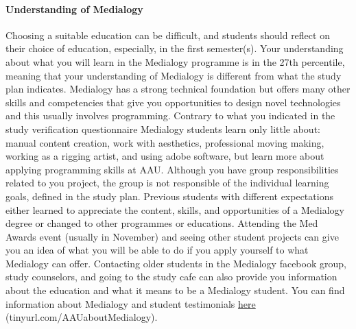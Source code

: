 \documentclass[]{article}
\let\oldparagraph\paragraph
\renewcommand{\paragraph}[1]{\oldparagraph{#1}\mbox{}}
\begin{document}
\paragraph{Understanding of Medialogy}\label{understanding-of-medialogy}

Choosing a suitable education can be difficult, and students should
reflect on their choice of education, especially, in the first
semester(s). Your understanding about what you will learn in the
Medialogy programme is in the 27th percentile, meaning that your
understanding of Medialogy is different from what the study plan
indicates. Medialogy has a strong technical foundation but offers many
other skills and competencies that give you opportunities to design
novel technologies and this usually involves programming. Contrary to
what you indicated in the study verification questionnaire Medialogy
students learn only little about: manual content creation, work with
aesthetics, professional moving making, working as a rigging artist, and
using adobe software, but learn more about applying programming skills
at AAU. Although you have group responsibilities related to you project,
the group is not responsible of the individual learning goals, defined
in the study plan. Previous students with different expectations either
learned to appreciate the content, skills, and opportunities of a
Medialogy degree or changed to other programmes or educations. Attending
the Med Awards event (usually in November) and seeing other student
projects can give you an idea of what you will be able to do if you
apply yourself to what Medialogy can offer. Contacting older students in
the Medialogy facebook group, study counselors, and going to the study
cafe can also provide you information about the education and what it
means to be a Medialogy student. You can find information about
Medialogy and student testimonials
\href{tinyurl.com/AAUaboutMedialogy}{here}
(tinyurl.com/AAUaboutMedialogy).
\end{document}
